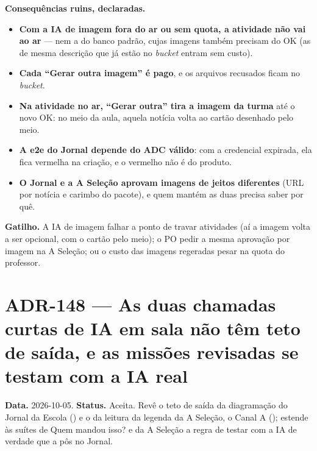\textbf{Consequências ruins, declaradas.}

\begin{itemize}
  \item \textbf{Com a IA de imagem fora do ar ou sem quota, a atividade não vai
    ao ar} --- nem a do banco padrão, cujas imagens também precisam do OK (as de
    mesma descrição que já estão no \emph{bucket} entram sem custo).
  \item \textbf{Cada \enquote{Gerar outra imagem} é pago}, e os arquivos
    recusados ficam no \emph{bucket}.
  \item \textbf{Na atividade no ar, \enquote{Gerar outra} tira a imagem da
    turma} até o novo OK: no meio da aula, aquela notícia volta ao cartão
    desenhado pelo meio.
  \item \textbf{A e2e do Jornal depende do ADC válido}: com a credencial
    expirada, ela fica vermelha na criação, e o vermelho não é do produto.
  \item \textbf{O Jornal e a A Seleção aprovam imagens de jeitos diferentes}
    (URL por notícia e carimbo do pacote), e quem mantém as duas precisa saber
    por quê.
\end{itemize}

\textbf{Gatilho.} A IA de imagem falhar a ponto de travar atividades (aí a
imagem volta a ser opcional, com o cartão pelo meio); o PO pedir a mesma
aprovação por imagem na A Seleção; ou o custo das imagens regeradas pesar na
quota do professor.

\section{ADR-148 --- As duas chamadas curtas de IA em sala não têm teto de saída, e as missões revisadas se testam com a IA real}
\label{adr:sem-teto-de-saida-em-sala}

\textbf{Data.} 2026-10-05. \textbf{Status.} Aceita. Revê o teto de saída da
diagramação do Jornal da Escola () e o da leitura da legenda da A
Seleção, o Canal A (); estende às suítes de Quem mandou isso? e da
A Seleção a regra de testar com a IA de verdade que a  pôs no
Jornal.

